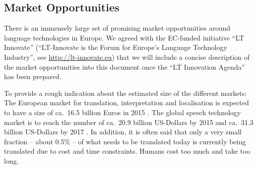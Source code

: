 \documentclass[10pt, plain]{../../metanetpaper}
\begin{document}
\begin{multicols}{2}
\subsection{Market Opportunities}
\label{sec:market-opportunities}

%

There is an immensely large set of promising market opportunities around language technologies in Europe. We agreed with the EC-funded initiative ``LT Innovate'' (``LT-Innovate is the Forum for Europe's Language Technology Industry'', see \url{http://lt-innovate.eu}) that we will include a concise description of the market opportunities into this document once the ``LT Innovation Agenda'' has been prepared.

To provide a rough indication about the estimated size of the different markets: The European market for translation, interpretation and localisation is expected to have a size of ca.~16.5 billion Euros in 2015 \cite{EC3}. The global speech technology market is to reach the number of ca.~20.9 billion US-Dollars by 2015 and ca.~31.3 billion US-Dollars by 2017 \cite{gia2012}. In addition, it is often said that only a very small fraction -- about 0.5\% -- of what needs to be translated today is currently being translated due to cost and time constraints. Humans cost too much and take too long.
\end{multicols}

\clearpage


\end{document}
